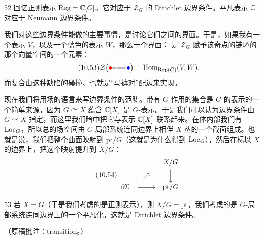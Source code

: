 \begin{srcex}{52}
回忆正则表示 $\mathrm{Reg}=\mathbb{C}[G]$。它对应于 $\mathcal{Z}_G$ 的 Dirichlet 边界条件。平凡表示 $\mathbb{C}$ 对应于 Neumann 边界条件。
\end{srcex}

我们对这些边界条件能做的主要事情，是讨论它们之间的界面。于是，如果我有一个表示 $V$，以及一个蓝色的表示 $W$，那么一个界面：
是 $\mathcal{Z}_G$ 赋予该奇点的链环的那个向量空间的一个元素：
\begin{equation}\tag{10.53}
\mathcal{Z}\big(\textcolor{red}{\bullet}\!\!-\!\!-\!\!-\!\textcolor{blue}{\bullet}\big)=\mathrm{Hom}_{\mathrm{Rep}(G)}(V,W).
\end{equation}
而复合由这种缺陷的碰撞、也就是“马裤对”配边来实现。

现在我们将用场的语言来写边界条件的范畴。带有 $G$ 作用的集合是 $G$ 的表示的一个简单来源，因为 $G\curvearrowright X$ 蕴含 $\mathbb{C}[X]$ 是 $G$-表示。于是我们可以认为边界条件由 $G\curvearrowright X$ 指定，而这里我们暗中把它与表示 $\mathbb{C}[X]$ 联系起来。在体内部我们有 $\mathrm{Loc}_G$，所以总的场空间由 $G$-局部系统连同边界上相伴 $X$-丛的一个截面组成。也就是说，我们把整个曲面映射到 $\mathrm{pt}/G$（这就是为什么得到 $\mathrm{Loc}_G$），然后在标以 $X$ 的边界上，把这个映射提升到 $X/G$：
\begin{equation}\tag{10.54}
\begin{array}{ccc}
& & X/G\\[4pt]
& \nearrow & \Big\downarrow\\[4pt]
\partial\Sigma & \xrightarrow{\qquad} & \mathrm{pt}/G
\end{array}
\end{equation}

\begin{srcex}{53}
若 $X=G$（于是我们考虑的是正则表示），则 $X/G=\mathrm{pt}$，我们考虑的是 $G$-局部系统连同边界上的一个平凡化，这就是 Dirichlet 边界条件。
\end{srcex}

\begin{flushright}\small（原稿批注：transition。）\end{flushright}



